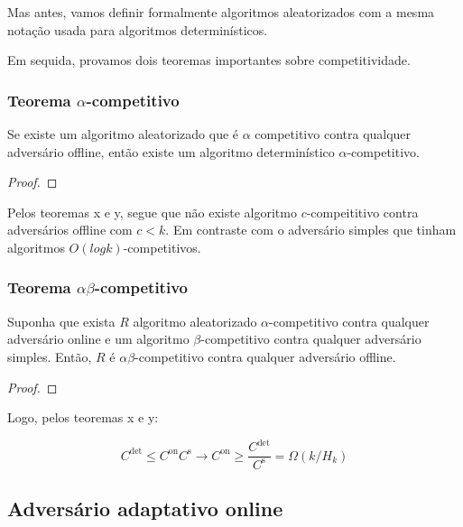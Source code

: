 \documentclass[a4paper,oneside,reqno,12pt]{amsart}
\begin{document}
Mas antes, vamos definir formalmente algoritmos aleatorizados com a mesma notação usada para algoritmos determinísticos.



Em sequida, provamos dois teoremas importantes sobre competitividade.

\subsubsection{Teorema $\alpha$-competitivo}

\begin{theorem}

  Se existe um algoritmo aleatorizado que é $\alpha$ competitivo contra qualquer adversário offline, então existe um algoritmo determinístico $\alpha$-competitivo.

  \begin{proof}
  \end{proof}

\end{theorem}

Pelos teoremas x e y, segue que não existe algoritmo $c$-compeititivo contra adversários offline com $c < k$. Em contraste com o adversário simples que tinham algoritmos $O(logk)$-competitivos.

\subsubsection{Teorema $\alpha\beta$-competitivo}

\begin{theorem}
  Suponha que exista $R$ algoritmo aleatorizado $\alpha$-competitivo contra qualquer adversário online e um algoritmo $\beta$-competitivo contra qualquer adversário simples. Então, $R$ é $\alpha\beta$-competitivo contra qualquer adversário offline.

  \begin{proof}
  \end{proof}

\end{theorem}

Logo, pelos teoremas x e y:

\[ C^{\text{det}} \leqslant C^{\text{on}}C^{\text{s}} \to 
C^{\text{on}} \geqslant \frac{C^{\text{det}}}{C^{\text{s}}} = \Omega(k/H_k)
\] 



\subsection{Adversário adaptativo online}
\end{document}

